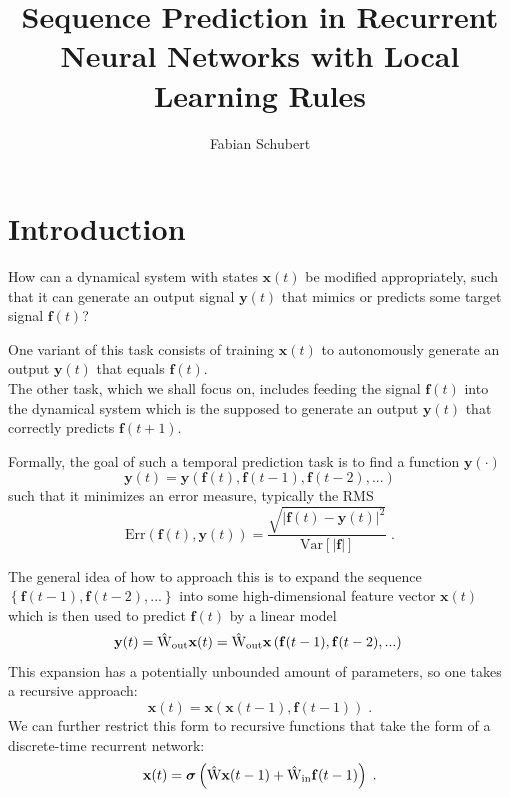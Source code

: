 \documentclass[10pt,a4paper]{article}
\author{Fabian Schubert}
\title{Sequence Prediction in Recurrent Neural Networks with Local Learning Rules}
\renewcommand{\vec}[1]{\mathbf{#1}}
\newcommand{\vx}{\vec{x}}
\newcommand{\vy}{\vec{y}}
\newcommand{\vf}{\vec{f}}
\newcommand{\vsigm}{\boldsymbol{\sigma}}
\newcommand{\Err}{\mathrm{Err}}
\newcommand{\Var}{\mathrm{Var}}
\newcommand{\Wout}{\hat{\mathrm{W}}_{\rm out}}
\newcommand{\Win}{\hat{\mathrm{W}}_{\rm in}}
\newcommand{\Wrec}{\hat{\mathrm{W}}}
\begin{document}
\maketitle

\section{Introduction}


How can a dynamical system with states $\vx(t)$ be modified appropriately, such that it can generate an output signal $\vy(t)$ that mimics or predicts some target signal $\vf(t)$?

One variant of this task consists of training $\vx(t)$ to autonomously generate an output $\vy(t)$ that equals $\vf(t)$.\\
The other task, which we shall focus on, includes feeding the signal $\vf(t)$ into the dynamical system which is the supposed to generate an output $\vy(t)$ that correctly predicts $\vf(t+1)$.

Formally, the goal of such a temporal prediction task is to find a function $\vy(\cdot)$
\begin{equation}
\vy(t) = \vy\left( \vf(t),\vf(t-1),\vf(t-2),...\right)
\end{equation}
such that it minimizes an error measure, typically the RMS
\begin{equation}
\Err\left(\vf(t),\vy(t)\right) = \frac{\sqrt{\left| \vf(t) - \vy(t)\right|^2}}{\Var\left[ | \vf|\right]} \; .
\end{equation}

The general idea of how to approach this is to expand the sequence $\left\{ \vf(t-1),\vf(t-2), ...\right\}$ into some high-dimensional feature vector $\vx(t)$ which is then used to predict $\vf(t)$ by a linear model
\begin{equation}
\vy(t) = \Wout \vx(t) = \Wout \vx\left( \vf(t-1),\vf(t-2),...\right) \;
\end{equation}
This expansion has a potentially unbounded amount of parameters, so one takes a recursive approach:
\begin{equation}
\vx(t) = \vx\left(\vx(t-1),\vf(t-1)\right) \;.
\end{equation}
We can further restrict this form to recursive functions that take the form of a discrete-time recurrent network:
\begin{equation}
\vx(t) = \vsigm \left( \Wrec \vx (t-1) + \Win \vf(t-1) \right) \; .
\end{equation}
\end{document}
